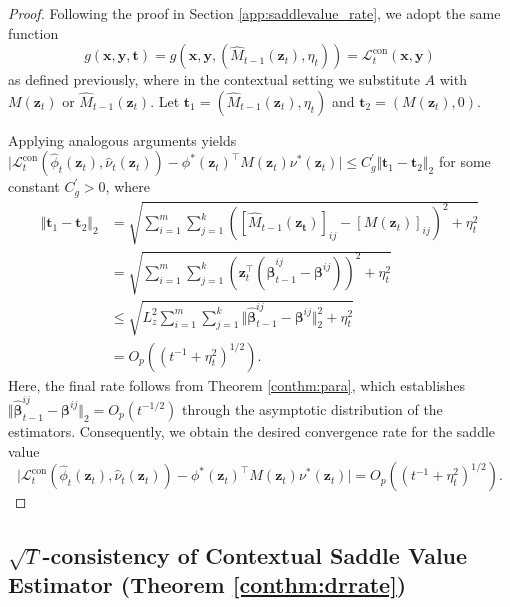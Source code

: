 \documentclass[12pt]{article}
\begin{document}
\begin{proof}
Following the proof in Section \ref{app:saddlevalue_rate}, we adopt the same function 
\[
g(\bm{x},\bm{y},\bm{t})=g(\bm{x},\bm{y},(\widehat{M}_{t-1}(\bm{z}_t),\eta_t)) = {\mathcal{L}}_t^{\mathrm{con}}(\bm{x},\bm{y})
\]
as defined previously, where in the contextual setting we substitute $A$ with $M(\bm{z}_t)$ or $\widehat{M}_{t-1}(\bm{z}_t)$. Let $\bm{t}_1 = (\widehat{M}_{t-1}(\bm{z}_t),\eta_t)$ and $\bm{t}_2 = (M(\bm{z}_t),0)$.

Applying analogous arguments yields $\vert {\mathcal{L}}_t^{\mathrm{con}}(\widehat{\phi}_t(\bm{z}_t),\widehat{\nu}_t(\bm{z}_t)) - \phi^\ast(\bm{z}_t)^\top M(\bm{z}_t) \nu^\ast(\bm{z}_t) \vert \le C_g^\prime \Vert \bm{t}_1 - \bm{t}_2 \Vert_2$ for some constant $C_g^\prime >0$, where
\begin{align*}
    \Vert \bm{t}_1 - \bm{t}_2 \Vert_2 &= \sqrt{\sum_{i=1}^m\sum_{j=1}^k \left([\widehat{M}_{t-1}(\bm{z_t})]_{ij}-[M(\bm{z}_t)]_{ij}\right)^2 + \eta_t^2} \\
    &= \sqrt{\sum_{i=1}^m\sum_{j=1}^k \left(\bm{z}_t^\top(\widehat{\bm{\beta}}_{t-1}^{ij}-\bm{\beta}^{ij}) \right)^2 + \eta_t^2}\\
    & \le \sqrt{L_z^2\sum_{i=1}^m\sum_{j=1}^k \Vert\widehat{\bm{\beta}}_{t-1}^{ij}-\bm{\beta}^{ij}\Vert_2^2 + \eta_t^2}\\
    &= O_p\left((t^{-1}+\eta_t^2)^{1/2}\right).
\end{align*}
Here, the final rate follows from Theorem \ref{conthm:para}, which establishes $\Vert \widehat{\bm{\beta}}_{t-1}^{ij}-\bm{\beta}^{ij}\Vert_2 = O_p(t^{-1/2})$ through the asymptotic distribution of the estimators. Consequently, we obtain the desired convergence rate for the saddle value
\[
\vert {\mathcal{L}}_t^{\mathrm{con}}(\widehat{\phi}_t(\bm{z}_t),\widehat{\nu}_t(\bm{z}_t)) - \phi^\ast(\bm{z}_t)^\top M(\bm{z}_t) \nu^\ast(\bm{z}_t) \vert = O_p\left((t^{-1}+\eta_t^2)^{1/2}\right).
\]
\end{proof}


\subsection{$\sqrt{T}$-consistency of Contextual Saddle Value Estimator (Theorem \ref{conthm:drrate})}
\label{app:conthm:drrate_proof}
\end{document}
